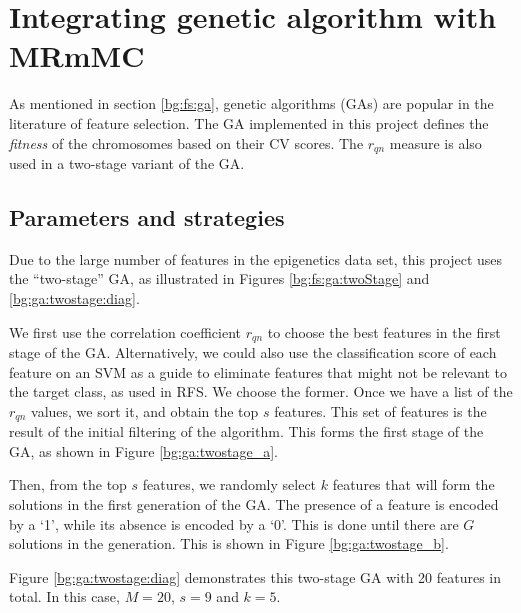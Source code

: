 \documentclass[12pt, twoside, a4paper]{report}
\begin{document}



\section{Integrating genetic algorithm with MRmMC} \label{ga:mrmmc}

As mentioned in section \ref{bg:fs:ga}, genetic algorithms (GAs) are popular in the literature of feature selection. The GA implemented in this project defines the \textit{fitness} of the chromosomes based on their CV scores. The $r_{qn}$ measure is also used in a two-stage variant of the GA.


\subsection{Parameters and strategies}
\label{body:ga:params}

Due to the large number of features in the epigenetics data set, this project uses the ``two-stage'' GA, as illustrated in Figures \ref{bg:fs:ga:twoStage} and \ref{bg:ga:twostage:diag}.

We first use the correlation coefficient $r_{qn}$ to choose the best features in the first stage of the GA. Alternatively, we could also use the classification score of each feature on an SVM as a guide to eliminate features that might not be relevant to the target class, as used in RFS. We choose the former. Once we have a list of the $r_{qn}$ values, we sort it, and obtain the top $s$ features. This set of features is the result of the initial filtering of the algorithm. This forms the first stage of the GA, as shown in Figure \ref{bg:ga:twostage_a}.

Then, from the top $s$ features, we randomly select $k$ features that will form the solutions in the first generation of the GA. The presence of a feature is encoded by a `1', while its absence is encoded by a `0'. This is done until there are $G$ solutions in the generation. This is shown in Figure \ref{bg:ga:twostage_b}.


Figure \ref{bg:ga:twostage:diag} demonstrates this two-stage GA with 20 features in total. In this case, $M=20$, $s=9$ and $k=5$.
\end{document}
